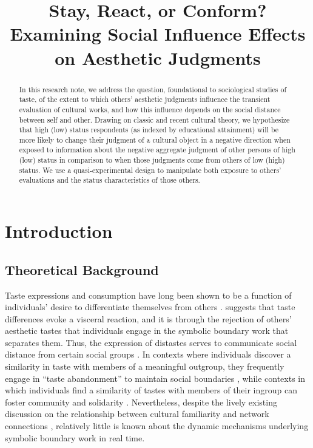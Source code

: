 \documentclass[12pt, letterpaper]{article}
\title{Stay, React, or Conform? Examining Social Influence Effects on Aesthetic Judgments}
\author{}
\date{}
\begin{document}
\maketitle

\begin{abstract}
In this research note, we address the question, foundational to sociological studies of taste, of the extent to which others' aesthetic judgments influence the transient evaluation of cultural works, and how this influence depends on the social distance between self and other. Drawing on classic and recent cultural theory, we hypothesize that high (low) status respondents (as indexed by educational attainment) will be more likely to change their judgment of a cultural object in a negative direction when exposed to information about the negative aggregate judgment of other persons of high (low) status in comparison to when those judgments come from others of low (high) status. We use a quasi-experimental design to manipulate both exposure to others' evaluations and the status characteristics of those others.
\end{abstract}

\newpage
\section{Introduction}

\subsection{Theoretical Background}
Taste expressions and consumption have long been shown to be a function of individuals’ desire to differentiate themselves from others \citep{simmel1957, dimaggio1987}. \citet{bourdieu1984} suggests that taste differences evoke a visceral reaction, and it is through the rejection of others’ aesthetic tastes that individuals engage in the symbolic boundary work that separates them. Thus, the expression of distastes serves to communicate social distance from certain social groups \citep{bryson1996, lamont2002}. In contexts where individuals discover a similarity in taste with members of a meaningful outgroup, they frequently engage in ``taste abandonment'' to maintain social boundaries \citep{berger2008}, while contexts in which individuals find a similarity of tastes with members of their ingroup can foster community and solidarity \citep{wohl2015community-2d2, vanzella2022tastes}. Nevertheless, despite the lively existing discussion on the relationship between cultural familiarity and network connections \citep{erickson1996, lizardo2006}, relatively little is known about the dynamic mechanisms underlying symbolic boundary work in real time.
\end{document}
